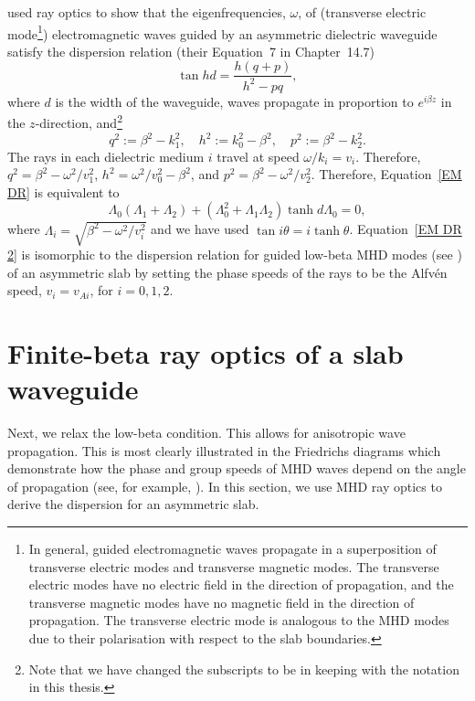 	\cite{ram_etal84} used ray optics to show that the eigenfrequencies, $\omega$, of (transverse electric mode\footnote{In general, guided electromagnetic waves propagate in a superposition of transverse electric modes and transverse magnetic modes. The transverse electric modes have no electric field in the direction of propagation, and the transverse magnetic modes have no magnetic field in the direction of propagation. The transverse electric mode is analogous to the MHD modes due to their polarisation with respect to the slab boundaries.}) electromagnetic waves guided by an asymmetric dielectric waveguide satisfy the dispersion relation (their Equation~7 in Chapter~14.7)
	\begin{equation}
	\tan{hd} = \frac{h(q + p)}{h^2 - pq}, \label{EM DR}
	\end{equation}
	where $d$ is the width of the waveguide, waves propagate in proportion to $e^{i\beta z}$ in the $z$-direction, and\footnote{Note that we have changed the subscripts to be in keeping with the notation in this thesis.} 
	\begin{equation}
	q^2 := \beta^2 - k_1^2, \quad h^2 := k_0^2 - \beta^2, \quad p^2 := \beta^2 - k_2^2.
	\end{equation}
	The rays in each dielectric medium $i$ travel at speed $\omega/k_i = v_i$. Therefore, $q^2 = \beta^2 - \omega^2/v_1^2$, $h^2 = \omega^2/v_0^2 - \beta^2$, and $p^2 = \beta^2 - \omega^2/v_2^2$. Therefore, Equation~\eqref{EM DR} is equivalent to
	\begin{equation}
	\Lambda_0(\Lambda_1 + \Lambda_2) + (\Lambda_0^2 + \Lambda_1\Lambda_2)\tanh{d\Lambda_0} = 0, \label{EM DR 2}
	\end{equation}
	where $\Lambda_i = \sqrt{\beta^2 - \omega^2/v_i^2}$ and we have used $\tan{i\theta} = i \tanh{\theta}$. Equation~\eqref{EM DR 2} is isomorphic to the dispersion relation for guided low-beta MHD modes (see \citealp{all_etal17}) of an asymmetric slab by setting the phase speeds of the rays to be the Alfv\'{e}n speed, $v_i = v_{Ai}$, for $i = 0, 1, 2$.
	
	
	\section{Finite-beta ray optics of a slab waveguide}
	\label{sec: finite beta}
	
	Next, we relax the low-beta condition. This allows for anisotropic wave propagation. This is most clearly illustrated in the Friedrichs diagrams which demonstrate how the phase and group speeds of MHD waves depend on the angle of propagation (see, for example, \citealp{goe_etal04,pri14}). In this section, we use MHD ray optics to derive the dispersion for an asymmetric slab.
	
